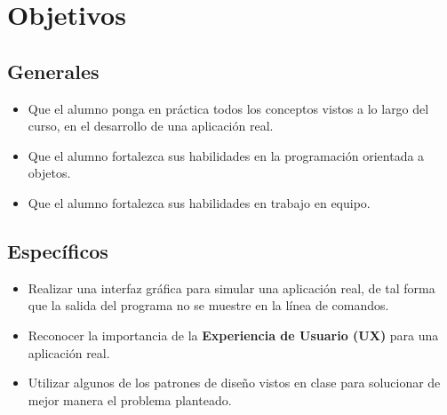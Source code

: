 \section*{Objetivos}

\subsection*{Generales}

\begin{itemize}
  \item Que el alumno ponga en práctica todos los conceptos vistos a lo largo 
  del curso, en el desarrollo de una aplicación real.
  \item Que el alumno fortalezca sus habilidades en la programación orientada 
  a objetos.
  \item Que el alumno fortalezca sus habilidades en trabajo en equipo.
\end{itemize}

\subsection*{Específicos}

\begin{itemize}
  \item Realizar una interfaz gráfica para simular una aplicación real, de tal 
  forma que la salida del programa no se muestre en la línea de comandos.
  \item Reconocer la importancia de la \textbf{Experiencia de Usuario (UX)} 
  para una aplicación real.
  \item Utilizar algunos de los patrones de diseño vistos en clase para 
  solucionar de mejor manera el problema planteado.
\end{itemize}

\pagebreak
